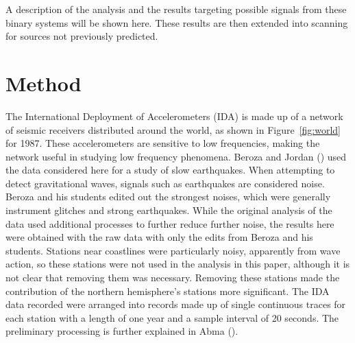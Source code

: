 A description of the analysis and the results targeting possible signals from these binary systems will be shown here.
These results are then extended into scanning for sources not previously predicted.





\section{Method}


The International Deployment of Accelerometers (IDA) is made up of a network of seismic receivers distributed around the world, as shown in Figure~\ref{fig:world} for 1987. 
These accelerometers are sensitive to low frequencies, making the network useful in studying low frequency
phenomena.  Beroza and Jordan (\citeyear{Beroza2}) used the data considered here for a study of slow earthquakes.  
When attempting to detect gravitational waves, signals such as earthquakes are considered noise.
Beroza and his students edited out the strongest noises, which were generally instrument glitches
and strong earthquakes.
While the original analysis of the data used additional processes to further reduce further noise, the results here were
obtained with the raw data with only the edits from Beroza and his students.  
Stations near coastlines were particularly noisy, apparently from wave action, so these stations were not used in the analysis in this paper, 
although it is not clear that removing them was necessary.   
Removing these stations made the contribution of the northern hemisphere's stations more significant.  
The IDA data recorded were arranged into records made up of
single continuous traces for each station with a length of one year and a sample interval of 20 seconds.  The preliminary processing is further explained in Abma (\citeyear{raya1}).
  
  
